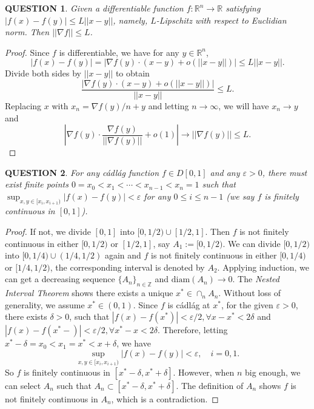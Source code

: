 \documentclass[12pt]{article}
\renewcommand{\(}{\left(}%
\renewcommand{\)}{\right)}%
\renewcommand{\[}{\left[}%
\renewcommand{\]}{\right]}%
\renewcommand{\r}{\mathbb{R}}
\newcommand{\z}{\mathbb{Z}}
\newtheorem{question}{QUESTION}[section]}
\newtheorem{proof}{Proof.}}
\begin{document}
\begin{question}
	Given a differentiable function $f:\r^n\to\r$ satisfying $|f(x)-f(y)|\leq L||x-y||$, namely, $L$-Lipschitz with respect to Euclidian norm. Then $||\nabla f||\leq L$.
\end{question}
\begin{proof}
	Since $f$ is differentiable, we have for any $y\in \r^n$,
	\begin{equation*}
		|f(x)-f(y)|=|\nabla f(y)\cdot(x-y)+o(||x-y||)|\leq L||x-y||.
	\end{equation*}
	Divide both sides by $||x-y||$ to obtain
	\begin{equation*}
		\frac{|\nabla f(y) \cdot(x-y)+o(||x-y||)|}{||x-y||}\leq L.
	\end{equation*}
	Replacing $x$ with $x_n=\nabla f(y) /n+y$ and letting $n\to\infty$, we will have $x_n\to y$ and
	\begin{equation*}
		\left|\nabla f(y) \cdot \frac{\nabla f(y) }{||\nabla f(y) ||}+o(1) \right|\to ||\nabla f(y) || \leq L.
	\end{equation*}
\end{proof}

\begin{question}
	For any c\'adl\'ag function $f\in D[0,1]$ and any $\varepsilon>0$, there must exist finite points $0=x_0<x_1<\cdots<x_{n-1}<x_n=1$ such that $\sup_{x,y\in[x_i,x_{i+1})}|f(x)-f(y)|<\varepsilon$ for any $ 0\leq i\leq n-1$ (we say $f$ is finitely continuous in $[0,1]$).
\end{question}
\begin{proof}
	If not, we divide $[0,1]$ into $[0,1/2)\cup [1/2,1]$. Then $f$ is not finitely continuous in either $[0,1/2)$ or $[1/2,1]$, say $A_1:=[0,1/2)$. We can divide $[0,1/2)$ into $[0,1/4)\cup(1/4,1/2)$ again and $f$ is not finitely continuous in either $[0,1/4)$ or $[1/4,1/2)$, the corresponding interval is denoted by $A_2$. Applying induction, we can get a decreasing sequence $\{A_n\}_{n\in\z}$ and $\mathrm{diam}(A_n)\to 0$. The {\itshape Nested Interval Theorem} shows there exists a unique $x^*\in \cap_n A_n$. Without loss of generality, we assume $x^*\in(0,1)$. Since $f$ is c\'adl\'ag at $x^*$, for the given $\varepsilon>0$, there exists $\delta>0$, such that $|f(x)-f(x^*)|<\varepsilon/2,\forall x-x^*<2\delta$ and $|f(x)-f(x^*-)|<\varepsilon/2,\forall x^*-x<2\delta$. Therefore, letting $x^*-\delta =x_0<x_1=x^*<x+\delta$, we have
	\begin{equation*}
		\sup_{x,y\in[x_i,x_{i+1})}|f(x)-f(y)|<\varepsilon,\quad i=0,1.
	\end{equation*}
	So $f$ is finitely continuous in $[x^*-\delta,x^*+\delta]$. However, when $n$ big enough, we can select $A_n$ such that $A_n\subset [x^*-\delta,x^*+\delta]$. The definition of $A_n$ shows $f$ is not finitely continuous in $A_n$, which is a contradiction.
\end{proof}
\end{document}
